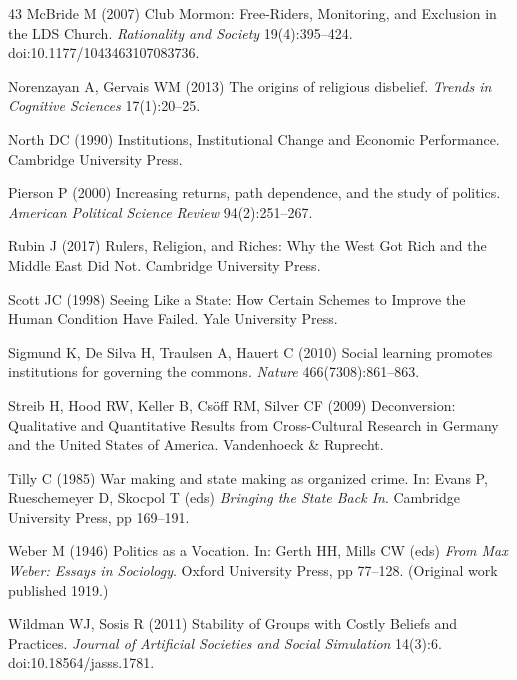 \documentclass[12pt]{article}
\begin{document}
\begin{thebibliography}{43}
McBride M (2007) Club Mormon: Free-Riders, Monitoring, and Exclusion in the LDS Church. \textit{Rationality and Society} 19(4):395--424. doi:10.1177/1043463107083736.

Norenzayan A, Gervais WM (2013) The origins of religious disbelief. \textit{Trends in Cognitive Sciences} 17(1):20--25.

North DC (1990) Institutions, Institutional Change and Economic Performance. Cambridge University Press.

Pierson P (2000) Increasing returns, path dependence, and the study of politics. \textit{American Political Science Review} 94(2):251--267.

Rubin J (2017) Rulers, Religion, and Riches: Why the West Got Rich and the Middle East Did Not. Cambridge University Press.

Scott JC (1998) Seeing Like a State: How Certain Schemes to Improve the Human Condition Have Failed. Yale University Press.

Sigmund K, De Silva H, Traulsen A, Hauert C (2010) Social learning promotes institutions for governing the commons. \textit{Nature} 466(7308):861--863.

Streib H, Hood RW, Keller B, Cs\"off RM, Silver CF (2009) Deconversion: Qualitative and Quantitative Results from Cross-Cultural Research in Germany and the United States of America. Vandenhoeck \& Ruprecht.

Tilly C (1985) War making and state making as organized crime. In: Evans P, Rueschemeyer D, Skocpol T (eds) \textit{Bringing the State Back In}. Cambridge University Press, pp 169--191.

Weber M (1946) Politics as a Vocation. In: Gerth HH, Mills CW (eds) \textit{From Max Weber: Essays in Sociology}. Oxford University Press, pp 77--128. (Original work published 1919.)

Wildman WJ, Sosis R (2011) Stability of Groups with Costly Beliefs and Practices. \textit{Journal of Artificial Societies and Social Simulation} 14(3):6. doi:10.18564/jasss.1781.

\end{thebibliography}
\end{document}
